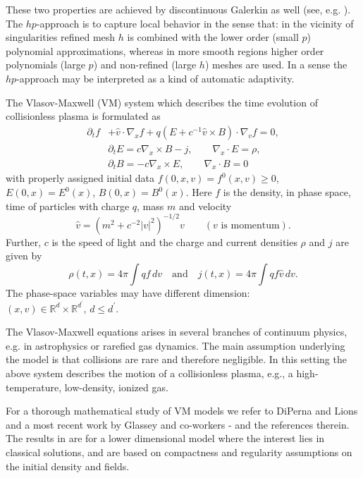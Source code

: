 \documentclass[reqno,a4paper]{amsart}
\theoremstyle{remark}
\numberwithin{equation}{section}
\def\d{\partial}
\begin{document}
These two properties are achieved by discontinuous Galerkin as well (see, e.g. \cite{Bre}).
The $hp$-approach is to capture local behavior in the sense that: in 
the vicinity of singularities refined mesh $h$ is combined with the 
lower order (small $p$) polynomial approximations, whereas in more smooth 
regions higher order polynomials (large $p$) and non-refined (large $h$) meshes 
are used. In a sense the $hp$-approach may be interpreted as a kind of 
automatic adaptivity. 

The Vlasov-Maxwell (VM) system which describes the time evolution of 
collisionless 
plasma is formulated as 
\begin{equation}\label{VMI}
\begin{aligned}
\d_t f &+\hat v\cdot \nabla_x f+q(E+c^{-1} \hat{v}\times B)\cdot \nabla_v f=0,\\
&\d_t E=c \nabla_x \times B-j,\qquad \nabla_x \cdot E=\rho, \\
&\d_t B=-c\nabla_x \times E, \qquad  \nabla_x \cdot B=0
\end{aligned}
\end{equation}
with properly assigned initial data
$f(0,x,v)=f^0(x,v)\ge0$, $E(0,x)=E^0(x)$, $B(0,x)=B^0(x)$.
Here $f$ is the density, in phase space, time of 
particles with charge $q$,
mass $m$ and velocity 
$$
\hat v=(m^2+c^{-2}\vert v\vert^2)^{-1/2} v\qquad (v\,\,  \mbox{is momentum}).
$$
Further, $c$ is the speed of light and the charge and current densities $\rho$
and $j$ are given by 
\begin{equation*} %
\rho(t,x)=4\pi\int qf\, dv \quad \mbox{and} \quad j(t,x)= 4\pi\int qf\hat v\, dv. 
\end{equation*}
The phase-space variables may have different dimension: 
$(x,v)\in {\mathbb R}^d\times {\mathbb R}^{d^\prime}, \, d \leq d^\prime $.

The Vlasov-Maxwell equations arises in several branches of continuum physics, 
e.g. in astrophysics or rarefied gas dynamics. 
The main assumption underlying the model is that collisions are 
rare and therefore negligible. In this setting the above system describes the 
motion of a collisionless plasma, e.g., a high-temperature, 
low-density, ionized gas. 

For a thorough mathematical study of 
 VM models we refer to 
DiPerna and Lions \cite{DiPerna_Lions} 
and a most recent work by Glassey and co-workers 
\cite{Glassey:2016}-\cite{Glassey:90} and 
the references therein. The results in \cite{Glassey:2016} are for 
a lower dimensional model where the interest lies in classical solutions, 
and are based on compactness and regularity assumptions on the 
initial density and fields. 
\end{document}
